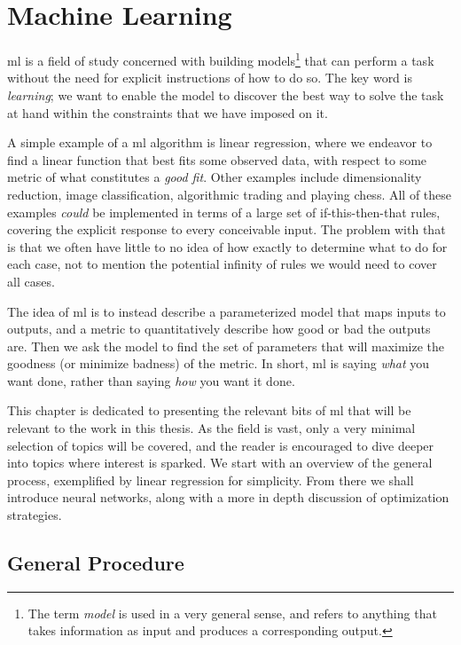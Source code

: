 \documentclass[Thesis.tex]{subfiles}
\begin{document}
\chapter{Machine Learning}
\label{chp:machine-learning}

\Acrfull{ml} is a field of study concerned with building
models\footnote{The term \emph{model} is used in a very general sense, and
refers to anything that takes information as input and produces a corresponding
output.} that can perform a task without the need for explicit instructions of
how to do so. The key word is \emph{learning}; we want to enable the model to
discover the best way to solve the task at hand within the constraints that we
have imposed on it.

A simple example of a \gls{ml} algorithm is linear regression, where we endeavor to
find a linear function that best fits some observed data, with respect to some
metric of what constitutes a \emph{good fit}. Other examples include
dimensionality reduction, image classification, algorithmic trading and playing
chess. All of these examples \emph{could} be implemented in terms of a
large set of if-this-then-that rules, covering the explicit response to every
conceivable input. The problem with that is that we often have little to no idea
of how exactly to determine what to do for each case, not to mention the
potential infinity of rules we would need to cover all cases.

The idea of \gls{ml} is to instead describe a parameterized model that
maps inputs to outputs, and a metric to quantitatively describe how good or bad
the outputs are. Then we ask the model to find the set of parameters that will
maximize the goodness (or minimize badness) of the metric. In short, \gls{ml}
is saying \emph{what} you want done, rather than saying \emph{how} you
want it done.

This chapter is dedicated to presenting the relevant bits of \gls{ml} that will be
relevant to the work in this thesis. As the field is vast, only a very minimal
selection of topics will be covered, and the reader is encouraged to dive deeper
into topics where interest is sparked. We start with an overview of
the general process, exemplified by linear regression for simplicity. From there
we shall introduce neural networks, along with a more in depth discussion of
optimization strategies.



\section{General Procedure}
\end{document}
